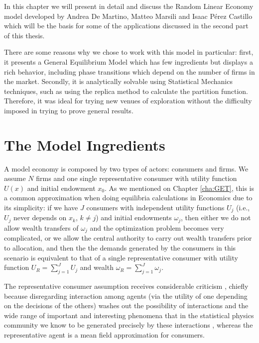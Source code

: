 In this chapter we will present in detail and discuss the Random
Linear Economy model \cite{DeMartinoMarsili04} developed by Andrea De
Martino, Matteo Marsili and Isaac Pérez Castillo which will be the
basis for some of the applications discussed in the second part of
this thesis.

There are some reasons why we chose to work with this model in
particular: first, it presents a General Equilibrium Model which has
few ingredients but displays a rich behavior, including phase
transitions which depend on the number of firms in the
market. Secondly, it is analytically solvable using Statistical
Mechanics techniques, such as using the replica method to calculate the
partition function. Therefore, it was ideal for trying new venues of
exploration without the difficulty imposed in trying to prove general
results. 

\section{The Model Ingredients}

A model economy is composed by two types of actors: consumers and firms. We assume $N$
firms and one single representative consumer with utility function
$U(x)$ and initial endowment $x_0$. As we mentioned on Chapter \ref{cha:GET}, this is a common approximation
when doing equilibria calculations in Economics due to its simplicity:
if we have $J$ consumers with independent utility functions $U_j$ (i.e.,
$U_j$ never depends on $x_k$, $k\neq j$) and initial endowments
$\omega_j$, then either we do not allow wealth transfers of $\omega_j$
and the optimization problem becomes very complicated, or we allow the
central authority to carry out wealth transfers prior to allocation,
and then the the demands generated by the consumers in this scenario
is equivalent to that of a single representative consumer with utility
function $U_R = \sum_{j=1}^J U_j$ and wealth
$\omega_R = \sum_{j=1}^J \omega_j$.

The representative consumer assumption receives considerable criticism
\cite{Kirman92}, chiefly because disregarding interaction among agents
(via the utility of one depending on the decisions of the others)
washes out the possibility of interactions and the wide range of
important and interesting phenomena that in the statistical physics
community we know to be generated precisely by these interactions
\cite{Bouchaud13}, whereas the representative agent is a mean field
approximation for consumers.

